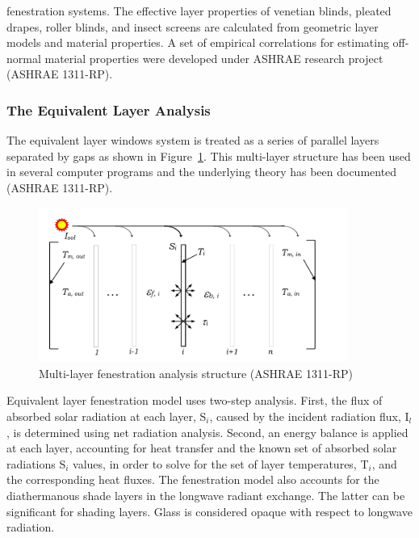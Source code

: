 fenestration systems. The effective layer properties of venetian blinds, pleated drapes, roller blinds, and insect screens are calculated from geometric layer models and material properties. A set of empirical correlations for estimating off-normal material properties were developed under ASHRAE research project (ASHRAE 1311-RP).

\subsubsection{The Equivalent Layer Analysis}\label{the-equivalent-layer-analysis}

The equivalent layer windows system is treated as a series of parallel layers separated by gaps as shown in Figure~\ref{fig:multi-layer-fenestration-analysis-structure}. This multi-layer structure has been used in several computer programs and the underlying theory has been documented (ASHRAE 1311-RP).

\begin{figure}[hbtp] %
\centering
\includegraphics[width=0.9\textwidth, height=0.9\textheight, keepaspectratio=true]{media/image1827.svg.png}
\caption{Multi-layer fenestration analysis structure (ASHRAE 1311-RP) \protect \label{fig:multi-layer-fenestration-analysis-structure}}
\end{figure}

Equivalent layer fenestration model uses two-step analysis. First, the flux of absorbed solar radiation at each layer, S\(_{i}\), caused by the incident radiation flux, I\(_{l}\), is determined using net radiation analysis. Second, an energy balance is applied at each layer, accounting for heat transfer and the known set of absorbed solar radiations S\(_{i}\) values, in order to solve for the set of layer temperatures, T\(_{i}\), and the corresponding heat fluxes. The fenestration model also accounts for the diathermanous shade layers in the longwave radiant exchange. The latter can be significant for shading layers. Glass is considered opaque with respect to longwave radiation.

